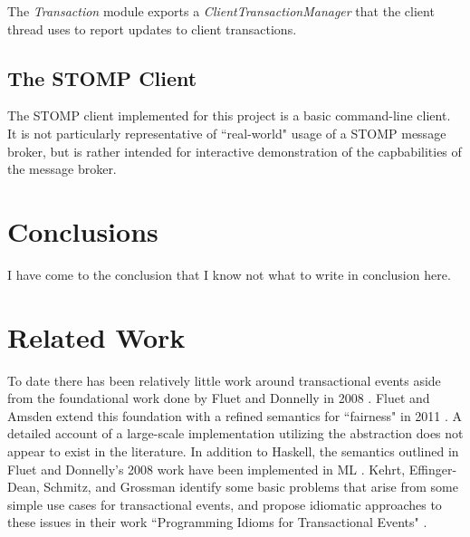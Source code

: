 \documentclass[conference, letterpaper]{IEEEtran}
\begin{document}
The \textit{Transaction} module exports a \textit{ClientTransactionManager} that the client thread uses to report updates to client transactions.

\subsection{The STOMP Client}

The STOMP client implemented for this project is a basic command-line client. It is not particularly representative of ``real-world" usage of a STOMP message broker, but is rather intended for interactive demonstration of the capbabilities of the message broker.

\section{Conclusions}

I have come to the conclusion that I know not what to write in conclusion here.

\section{Related Work}
To date there has been relatively little work around transactional events aside from the foundational work done by
Fluet and Donnelly in 2008 \cite{te:original}. Fluet and Amsden extend this foundation with a refined semantics  for ``fairness" in 2011 \cite{te:fairness}.
A detailed account of a large-scale implementation utilizing the abstraction does not appear to exist in the literature. 
In addition to Haskell, the semantics outlined in Fluet and Donnelly's 2008 work have been implemented in ML \cite{te:ml}. 
Kehrt, Effinger-Dean, Schmitz, and Grossman identify some basic problems that arise from some simple use cases for
transactional events, and propose idiomatic approaches to these issues in their work ``Programming Idioms for Transactional Events" \cite{te:idioms}.  



\end{document}
